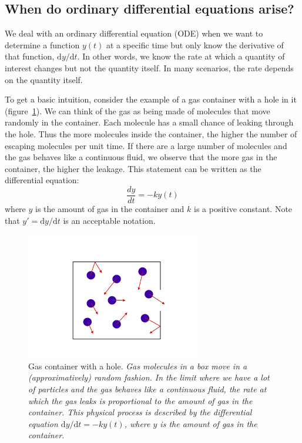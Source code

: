 \documentclass[11pt]{article}
\begin{document}
  \subsection{When do ordinary differential equations arise?}

  We deal with an ordinary differential equation (ODE) when we want to determine a
  function $y(t)$ at a specific time but only know the derivative of that function, $\mathrm{d}y/\mathrm{d}t$.
  In other words, we know the rate at which a quantity of interest changes but not the quantity 
  itself. In many scenarios, the rate depends on the quantity itself.

  To get a basic intuition, consider the example of a gas container with a hole in it  
  (figure~\ref{GasContainer}). We can think of the gas as being made of molecules that move 
  randomly in the container. Each molecule has a small chance of leaking through the hole. Thus
  the more molecules inside the container, the higher the number of escaping molecules per unit
  time. If there are a large number of molecules and the gas behaves like a continuous fluid, we
  observe that the more gas in the container, the higher the leakage. This statement can be 
  written as the differential equation:
  $$ \frac{dy}{dt} = -ky(t)$$
  where $y$ is the amount of gas in the container and $k$ is a positive constant. Note
  that $y' = \mathrm{d}y/\mathrm{d}t$ is an acceptable notation.

\begin{figure}[!htb]
\begin{center}
\includegraphics[width=3.0in,trim=0in 0in 0 0in]{graphics/GasInBox.png}
\caption{{Gas container with a hole. \textit{Gas molecules in a box move in a (approximatively)
random fashion. In the limit where we have a lot of particles and the gas behaves like a 
continuous fluid, the rate at which the gas leaks is proportional to the amount of gas in the container.
This physical process is described by the differential equation $ \mathrm{d}y/\mathrm{d}t = -ky(t)$, 
where $y$ is the amount of gas in the container.}}}
\label{GasContainer}
\end{center}
\end{figure}
\end{document}
